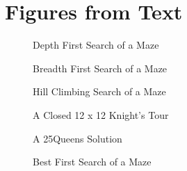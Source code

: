 \documentclass[letterpaper,10pt,english]{sphinxmanual}
\begin{document}
\begin{sphinxVerbatim}[commandchars=\\\{\},numbers=left,firstnumber=1,stepnumber=1]
    
   
    
    
\end{sphinxVerbatim}


\section{Figures from Text}
\label{\detokenize{chap12/chap12:figures-from-text}}
\begin{figure}[htbp]
\centering
\capstart

\noindent{}
\caption{Depth First Search of a Maze}\label{\detokenize{chap12/chap12:id3}}\end{figure}

\begin{figure}[htbp]
\centering
\capstart

\noindent{}
\caption{Breadth First Search of a Maze}\label{\detokenize{chap12/chap12:id4}}\end{figure}

\begin{figure}[htbp]
\centering
\capstart

\noindent{}
\caption{Hill Climbing Search of a Maze}\label{\detokenize{chap12/chap12:id5}}\end{figure}

\begin{figure}[htbp]
\centering
\capstart

\noindent{}
\caption{A Closed 12 x 12 Knight’s Tour}\label{\detokenize{chap12/chap12:id6}}\end{figure}

\begin{figure}[htbp]
\centering
\capstart

\noindent{}
\caption{A 25\sphinxhyphen{}Queens Solution}\label{\detokenize{chap12/chap12:id7}}\end{figure}

\begin{figure}[htbp]
\centering
\capstart

\noindent{}
\caption{Best First Search of a Maze}\label{\detokenize{chap12/chap12:id8}}\end{figure}
\end{document}
